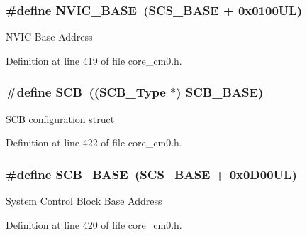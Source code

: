 \subsubsection[{\texorpdfstring{N\+V\+I\+C\+\_\+\+B\+A\+SE}{NVIC_BASE}}]{\setlength{\rightskip}{0pt plus 5cm}\#define N\+V\+I\+C\+\_\+\+B\+A\+SE~({\bf S\+C\+S\+\_\+\+B\+A\+SE} +  0x0100\+U\+L)}\hypertarget{group___c_m_s_i_s__core__register_gaa0288691785a5f868238e0468b39523d}{}\label{group___c_m_s_i_s__core__register_gaa0288691785a5f868238e0468b39523d}
N\+V\+IC Base Address 

Definition at line 419 of file core\+\_\+cm0.\+h.

\subsubsection[{\texorpdfstring{S\+CB}{SCB}}]{\setlength{\rightskip}{0pt plus 5cm}\#define S\+CB~(({\bf S\+C\+B\+\_\+\+Type} $\ast$)           {\bf S\+C\+B\+\_\+\+B\+A\+SE})}\hypertarget{group___c_m_s_i_s__core__register_gaaaf6477c2bde2f00f99e3c2fd1060b01}{}\label{group___c_m_s_i_s__core__register_gaaaf6477c2bde2f00f99e3c2fd1060b01}
S\+CB configuration struct 

Definition at line 422 of file core\+\_\+cm0.\+h.

\subsubsection[{\texorpdfstring{S\+C\+B\+\_\+\+B\+A\+SE}{SCB_BASE}}]{\setlength{\rightskip}{0pt plus 5cm}\#define S\+C\+B\+\_\+\+B\+A\+SE~({\bf S\+C\+S\+\_\+\+B\+A\+SE} +  0x0\+D00\+U\+L)}\hypertarget{group___c_m_s_i_s__core__register_gad55a7ddb8d4b2398b0c1cfec76c0d9fd}{}\label{group___c_m_s_i_s__core__register_gad55a7ddb8d4b2398b0c1cfec76c0d9fd}
System Control Block Base Address 

Definition at line 420 of file core\+\_\+cm0.\+h.

